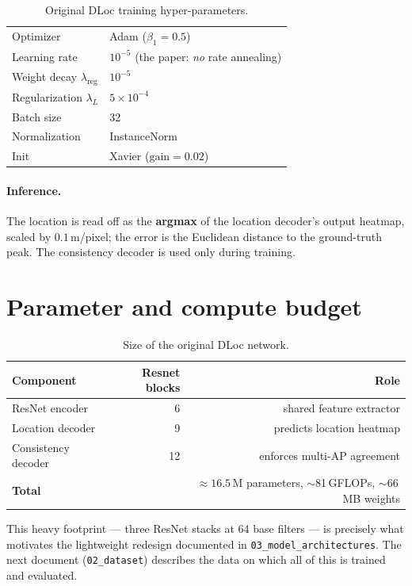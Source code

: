 \documentclass[11pt,a4paper]{article}
\begin{document}
\begin{table}[h]
\centering
\caption{Original DLoc training hyper-parameters.}
\begin{tabular}{@{}ll@{}}
\toprule
Optimizer & Adam ($\beta_1=0.5$) \\
Learning rate & $10^{-5}$ (the paper: \emph{no} rate annealing) \\
Weight decay $\lambda_{\text{reg}}$ & $10^{-5}$ \\
Regularization $\lambda_L$ & $5\times10^{-4}$ \\
Batch size & 32 \\
Normalization & InstanceNorm \\
Init & Xavier ($\text{gain}=0.02$) \\
\bottomrule
\end{tabular}
\end{table}

\paragraph{Inference.} The location is read off as the \textbf{argmax} of the location decoder's
output heatmap, scaled by $0.1$\,m/pixel; the error is the Euclidean distance to the ground-truth
peak. The consistency decoder is used only during training.

\section{Parameter and compute budget}

\begin{table}[h]
\centering
\caption{Size of the original DLoc network.}
\begin{tabular}{@{}lrr@{}}
\toprule
Component & Resnet blocks & Role \\
\midrule
ResNet encoder        & 6  & shared feature extractor \\
Location decoder      & 9  & predicts location heatmap \\
Consistency decoder   & 12 & enforces multi-AP agreement \\
\midrule
\textbf{Total}        &    & $\approx 16.5$\,M parameters, $\sim$81\,GFLOPs, $\sim$66\,MB weights \\
\bottomrule
\end{tabular}
\end{table}

This heavy footprint --- three ResNet stacks at 64 base filters --- is precisely what motivates
the lightweight redesign documented in \texttt{03\_model\_architectures}. The next document
(\texttt{02\_dataset}) describes the data on which all of this is trained and evaluated.
\end{document}
